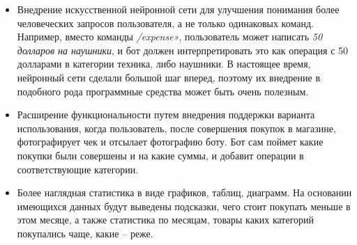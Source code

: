 \begin{itemize}
	\item Внедрение искусственной нейронной сети для улучшения понимания более человеческих запросов пользователя, а не только одинаковых команд. Например, вместо команды \emph{/expense»}, пользователь может написать \emph{50 долларов на наушники}, и бот должен интерпретировать это как операция с 50 долларами в категории техника, либо наушники. В настоящее время, нейронный сети сделали большой шаг вперед, поэтому их внедрение в подобного рода программные средства может быть очень полезным.
	\item Расширение функциональности путем внедрения поддержки варианта использования, когда пользователь, после совершения покупок в магазине, фотографирует чек и отсылает фотографию боту. Бот сам поймет какие покупки были совершены и на какие суммы, и добавит операции в соответствующие категории.
	\item Более наглядная статистика в виде графиков, таблиц, диаграмм. На основании имеющихся данных будут выведены подсказки, чего стоит покупать меньше в этом месяце, а также статистика по месяцам, товары каких категорий покупались чаще, какие – реже.
\end{itemize}
